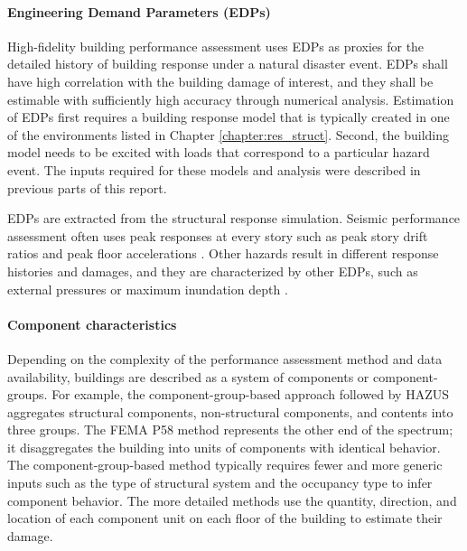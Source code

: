 \paragraph{Engineering Demand Parameters (EDPs)} High-fidelity building performance assessment uses EDPs as proxies for the detailed history of building response under a natural disaster event. EDPs shall have high correlation with the building damage of interest, and they shall be estimable with sufficiently high accuracy through numerical analysis. Estimation of EDPs first requires a building response model that is typically created in one of the environments listed in Chapter \ref{chapter:res_struct}. Second, the building model needs to be excited with loads that correspond to a particular hazard event. The inputs required for these models and analysis were described in previous parts of this report.

EDPs are extracted from the structural response simulation. Seismic performance assessment often uses peak responses at every story such as peak story drift ratios and peak floor accelerations \citep{atc2018p-58-1}. Other hazards result in different response histories and damages, and they are characterized by other EDPs, such as external pressures \citep{ouyang2020performance} or maximum inundation depth \citep{reese2011empirical}. 

\paragraph{Component characteristics} Depending on the complexity of the performance assessment method and data availability, buildings are described as a system of components or component-groups. For example, the component-group-based approach followed by HAZUS \citep{fema2011earthquaketechnical} aggregates structural components, non-structural components, and contents into three groups. The FEMA P58 method represents the other end of the spectrum; it disaggregates the building into units of components with identical behavior. The component-group-based method typically requires fewer and more generic inputs such as the type of structural system and the occupancy type to infer component behavior. The more detailed methods use the quantity, direction, and location of each component unit on each floor of the building to estimate their damage.


